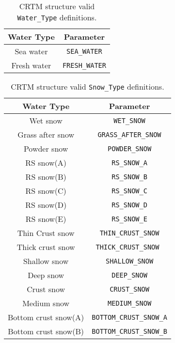 \begin{table}
  \centering
  \begin{tabular}{|c|c|}
    \hline
    \sffamily\textbf{Water Type} & \sffamily\textbf{Parameter} \\
    \hline\hline
      Sea water  &  \texttt{SEA\_WATER} \\     
     Fresh water &  \texttt{FRESH\_WATER} \\   
    \hline
  \end{tabular}
  \caption{CRTM \Surface{} structure valid \texttt{Water\_Type} definitions.}
  \label{tab:surface_water_type}
\end{table}

\begin{table}
  \centering
  \begin{tabular}{|c|c|}
    \hline
    \sffamily\textbf{Water Type} & \sffamily\textbf{Parameter} \\
    \hline\hline
         Wet snow          &   \texttt{WET\_SNOW} \\           
      Grass after snow     &   \texttt{GRASS\_AFTER\_SNOW} \\   
        Powder snow        &   \texttt{POWDER\_SNOW} \\        
         RS snow(A)        &   \texttt{RS\_SNOW\_A} \\          
         RS snow(B)        &   \texttt{RS\_SNOW\_B} \\          
         RS snow(C)        &   \texttt{RS\_SNOW\_C} \\          
         RS snow(D)        &   \texttt{RS\_SNOW\_D} \\          
         RS snow(E)        &   \texttt{RS\_SNOW\_E} \\          
      Thin Crust snow      &   \texttt{THIN\_CRUST\_SNOW} \\    
      Thick crust snow     &   \texttt{THICK\_CRUST\_SNOW } \\  
        Shallow snow       &   \texttt{SHALLOW\_SNOW} \\       
         Deep snow         &   \texttt{DEEP\_SNOW} \\          
        Crust snow         &   \texttt{CRUST\_SNOW} \\         
        Medium snow        &   \texttt{MEDIUM\_SNOW} \\        
     Bottom crust snow(A)  &   \texttt{BOTTOM\_CRUST\_SNOW\_A} \\
     Bottom crust snow(B)  &   \texttt{BOTTOM\_CRUST\_SNOW\_B} \\
    \hline
  \end{tabular}
  \caption{CRTM \Surface{} structure valid \texttt{Snow\_Type} definitions.}
  \label{tab:surface_snow_type}
\end{table}

